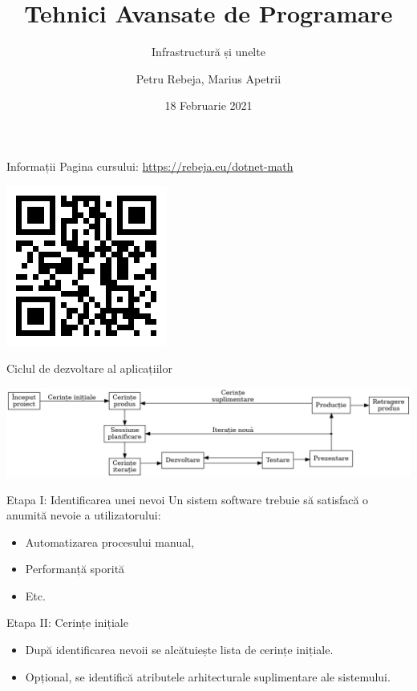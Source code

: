 \documentclass[presentation]{beamer}
\author{Petru Rebeja, Marius Apetrii}
\date{18 Februarie 2021}
\title{Tehnici Avansate de Programare}
\subtitle{Infrastructură și unelte}
\institute[UAIC]{Facultatea de Matematică\\Universitatea Alexandru Ioan Cuza, Iași}
\begin{document}
\maketitle
\begin{frame}[label={sec:orgfe36eca}]{Informații}
Pagina cursului: \url{https://rebeja.eu/dotnet-math}

\begin{center}
\includegraphics[height=0.6\textheight]{img/qr-pagina-curs.png}
\end{center}
\end{frame}
\begin{frame}[label={sec:orgdc42311}]{Ciclul de dezvoltare al aplicațiilor}
\begin{center}
\includegraphics[width=\textwidth]{./img/ciclul-agile.png}
\end{center}
\end{frame}
\begin{frame}[label={sec:org2403a96}]{Etapa I: Identificarea unei nevoi}
Un sistem software trebuie să satisfacă o anumită nevoie a utilizatorului:
\begin{itemize}
\item Automatizarea procesului manual,
\item Performanță sporită
\item Etc.
\end{itemize}
\end{frame}
\begin{frame}[label={sec:orgdaa9f15}]{Etapa II: Cerințe inițiale}
\begin{itemize}
\item După identificarea nevoii se alcătuiește lista de cerințe inițiale.
\item Opțional, se identifică atributele arhitecturale suplimentare ale sistemului.
\end{itemize}
\end{frame}
\end{document}
